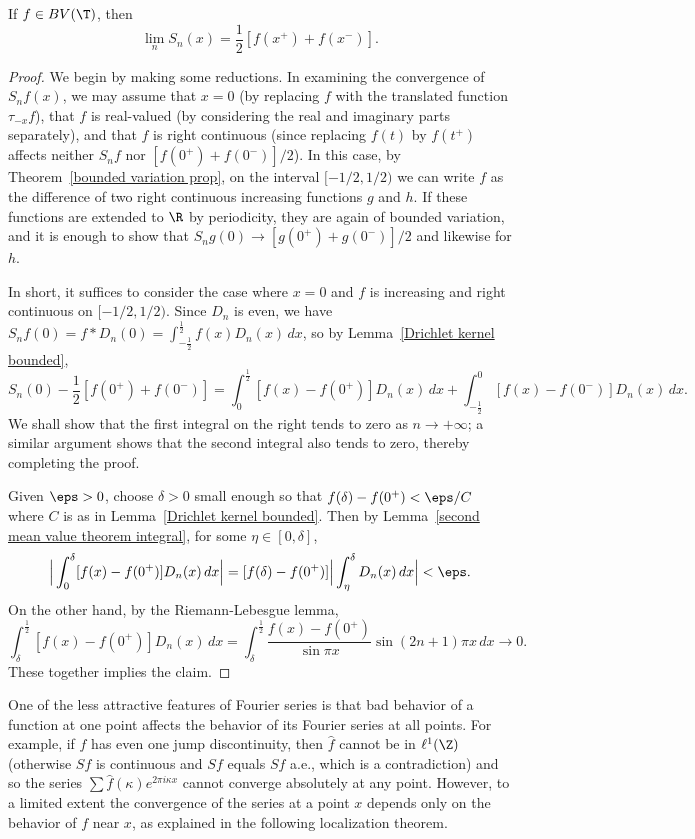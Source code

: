 \begin{theorem}
If $f\in BV(\T)$, then
\[\lim_nS_n(x)=\frac{1}{2}[f(x^+)+f(x^-)].\]
\end{theorem}
\begin{proof}
We begin by making some reductions. In examining the convergence of $S_nf(x)$, we may assume that $x=0$ (by replacing $f$ with the translated function $\tau_{-x}f$), that $f$ is real-valued (by considering the real and imaginary parts separately), and that $f$ is right continuous (since replacing $f(t)$ by $f(t^+)$ affects neither $S_nf$ nor $[f(0^+)+f(0^-)]/2$). In this case, by Theorem~\ref{bounded variation prop}, on the interval $[-1/2,1/2)$ we can write $f$ as the difference of two right continuous increasing functions $g$ and $h$. If these functions are extended to $\R$ by periodicity, they are again of bounded variation, and it is enough to show that $S_ng(0)\to[g(0^+)+g(0^-)]/2$ and likewise for $h$.\par
In short, it suffices to consider the case where $x=0$ and $f$ is increasing and right continuous on $[-1/2,1/2)$. Since $D_n$ is even, we have $S_nf(0)=f\ast D_n(0)=\int_{-\frac{1}{2}}^{\frac{1}{2}}f(x)D_n(x)\,dx$, so by Lemma~\ref{Drichlet kernel bounded},
\[S_n(0)-\frac{1}{2}[f(0^+)+f(0^-)]=\int_{0}^{\frac{1}{2}}[f(x)-f(0^+)]D_n(x)\,dx+\int_{-\frac{1}{2}}^{0}[f(x)-f(0^-)]D_n(x)\,dx.\]
We shall show that the first integral on the right tends to zero as $n\to+\infty$; a similar argument shows that the second integral also tends to zero, thereby completing the proof.\par
Given $\eps>0$, choose $\delta>0$ small enough so that $f(\delta)-f(0^+)<\eps/C$ where $C$ is as in Lemma~\ref{Drichlet kernel bounded}. Then by Lemma~\ref{second mean value theorem integral}, for some $\eta\in[0,\delta]$,
\begin{align*}
\Big|\int_{0}^{\delta}[f(x)-f(0^+)]D_n(x)\,dx\Big|=[f(\delta)-f(0^+)]\Big|\int_{\eta}^{\delta}D_n(x)\,dx\Big|<\eps.
\end{align*}
On the other hand, by the Riemann-Lebesgue lemma,
\[\int_{\delta}^{\frac{1}{2}}[f(x)-f(0^+)]D_n(x)\,dx=\int_{\delta}^{\frac{1}{2}}\frac{f(x)-f(0^+)}{\sin\pi x}\sin(2n+1)\pi x\,dx\to 0.\]
These together implies the claim.
\end{proof}
One of the less attractive features of Fourier series is that bad behavior of a function at one point affects the behavior of its Fourier series at all points. For example, if $f$ has even one jump discontinuity, then $\hat{f}$ cannot be in $\ell^1(\Z)$ (otherwise $Sf$ is continuous and $Sf$ equals $Sf$ a.e., which is a contradiction) and so the series $\sum\hat{f}(\kappa)e^{2\pi i\kappa x}$ cannot converge absolutely at any point. However, to a limited extent the convergence of the series at a point $x$ depends only on the behavior of $f$ near $x$, as explained in the following localization theorem.
